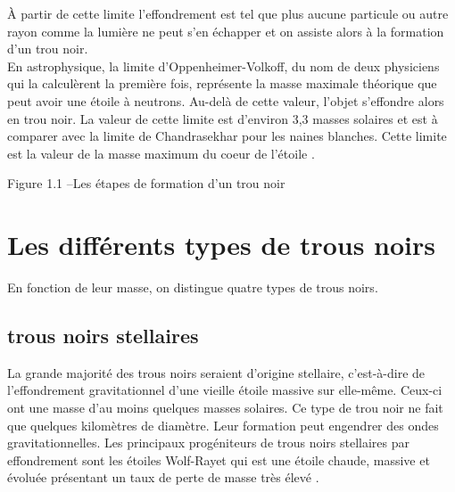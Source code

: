 	À partir de cette limite l’effondrement est tel que plus aucune particule ou autre rayon comme la lumière ne peut s’en échapper et on assiste alors à la formation d’un trou noir.\\
	En astrophysique, la limite d'Oppenheimer-Volkoff, du nom de deux physiciens qui la calculèrent la première fois, représente la masse maximale théorique que peut avoir une étoile à neutrons. Au-delà de cette valeur, l'objet s'effondre alors en trou noir. La valeur de cette limite est d'environ 3,3 masses solaires et est à comparer avec la limite de Chandrasekhar pour les naines blanches. Cette limite est la valeur de la masse maximum du coeur de l'étoile \cite{3}.
	\begin{center}
		
	\end{center}
	Figure 1.1 –Les étapes de formation d’un trou noir
	\section{Les différents types de trous noirs}
	En fonction de leur masse, on distingue quatre types de trous noirs.
	\subsection{ trous noirs stellaires }
	La grande majorité des trous noirs seraient d’origine stellaire, c'est-à-dire de l’effondrement gravitationnel d’une vieille étoile massive sur elle-même. Ceux-ci ont une masse d'au moins quelques masses solaires. Ce type de trou noir ne fait que quelques kilomètres de diamètre. Leur formation peut engendrer des ondes gravitationnelles.
	Les principaux progéniteurs de trous noirs stellaires par effondrement sont les étoiles Wolf-Rayet qui est une étoile chaude, massive et évoluée présentant un taux de perte de masse très élevé . 

